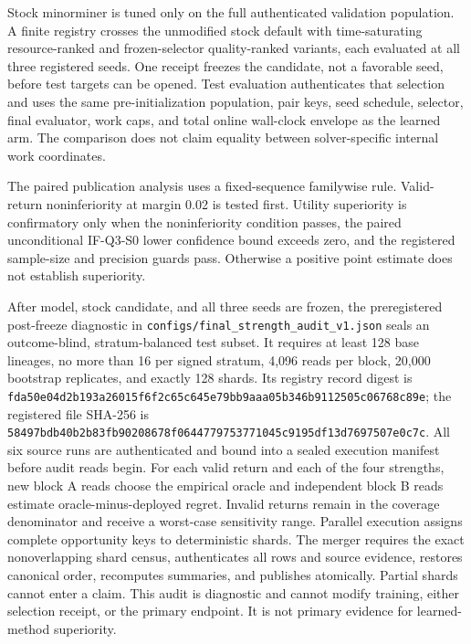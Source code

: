 \documentclass[10pt,a4paper]{article}
\begin{document}
Stock minorminer is tuned only on the full authenticated validation
population. A finite registry crosses the unmodified stock default with
time-saturating resource-ranked and frozen-selector quality-ranked
variants, each evaluated at all three registered seeds. One receipt
freezes the candidate, not a favorable seed, before test targets can be
opened. Test evaluation authenticates that selection and uses the same
pre-initialization population, pair keys, seed schedule, selector, final
evaluator, work caps, and total online wall-clock envelope as the
learned arm. The comparison does not claim equality between
solver-specific internal work coordinates.

The paired publication analysis uses a fixed-sequence familywise rule.
Valid-return noninferiority at margin 0.02 is tested first. Utility
superiority is confirmatory only when the noninferiority condition
passes, the paired unconditional IF-Q3-S0 lower confidence bound exceeds
zero, and the registered sample-size and precision guards pass.
Otherwise a positive point estimate does not establish superiority.

After model, stock candidate, and all three seeds are frozen, the
preregistered post-freeze diagnostic in
\texttt{configs/final\_strength\_audit\_v1.json} seals an outcome-blind,
stratum-balanced test subset. It requires at least 128 base lineages, no
more than 16 per signed stratum, 4,096 reads per block, 20,000 bootstrap
replicates, and exactly 128 shards. Its registry record digest is
\nolinkurl{fda50e04d2b193a26015f6f2c65c645e79bb9aaa05b346b9112505c06768c89e};
the registered file SHA-256 is
\nolinkurl{58497bdb40b2b83fb90208678f0644779753771045c9195df13d7697507e0c7c}.
All six source runs are authenticated and bound into a sealed execution
manifest before audit reads begin. For each valid return and each of the
four strengths, new block A reads choose the empirical oracle and
independent block B reads estimate
oracle-minus-deployed regret. Invalid returns remain in the coverage
denominator and receive a worst-case sensitivity range. Parallel
execution assigns complete opportunity keys to deterministic shards.
The merger requires the exact nonoverlapping shard census, authenticates
all rows and source evidence, restores canonical order, recomputes
summaries, and publishes atomically. Partial shards cannot enter a
claim. This audit is diagnostic and cannot modify training, either
selection receipt, or the primary endpoint. It is not primary evidence
for learned-method superiority.

\clearpage
\end{document}
